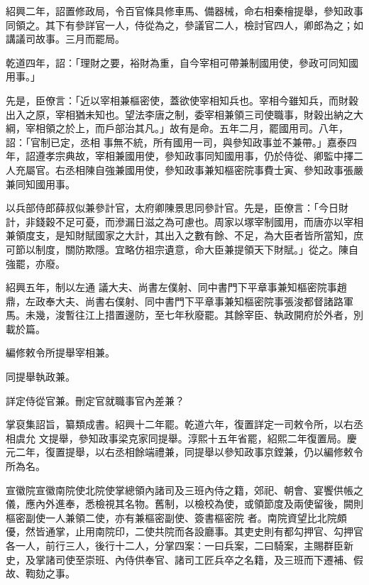 \begin{pinyinscope}
 紹興二年，詔置修政局，令百官條具修車馬、備器械，命右相秦檜提舉，參知政事同領之。其下有參詳官一人，侍從為之，參議官二人，檢討官四人，卿郎為之；如講議司故事。三月而罷局。



 乾道四年，詔：「理財之要，裕財為重，自今宰相可帶兼制國用使，參政可同知國用事。」



 先是，臣僚言：「近以宰相兼樞密使，蓋欲使宰相知兵也。宰相今雖知兵，而財穀出入之原，宰相猶未知也。望法李唐之制，委宰相兼領三司使職事，財穀出納之大綱，宰相領之於上，而戶部治其凡。」故有是命。五年二月，罷國用司。八年，詔：「官制已定，丞相
 事無不統，所有國用一司，與參知政事並不兼帶。」嘉泰四年，詔遵孝宗典故，宰相兼國用使，參知政事同知國用事，仍於侍從、卿監中擇二人充屬官。右丞相陳自強兼國用使，參知政事兼知樞密院事費士寅、參知政事張嚴兼同知國用事。



 以兵部侍郎薛叔似兼參計官，太府卿陳景思同參計官。先是，臣僚言：「今日財計，非錢穀不足可憂，而滲漏日滋之為可慮也。周家以塚宰制國用，而唐亦以宰相兼領度支，是知財賦國家之大計，其出入之數有餘、不足，為大臣者皆所當知，庶可節以制度，關防欺隱。宜略仿祖宗遺意，命大臣兼提領天下財賦。」從之。陳自強罷，亦廢。



 紹興五年，制以左通
 議大夫、尚書左僕射、同中書門下平章事兼知樞密院事趙鼎，左政奉大夫、尚書右僕射、同中書門下平章事兼知樞密院事張浚都督諸路軍馬。未幾，浚暫往江上措置邊防，至七年秋廢罷。其餘宰臣、執政開府於外者，別載於篇。



 編修敕令所提舉宰相兼。



 同提舉執政兼。



 詳定侍從官兼。刪定官就職事官內差兼？



 掌裒集詔旨，纂類成書。紹興十二年罷。乾道六年，復置詳定一司敕令所，以右丞相虞允
 文提舉，參知政事梁克家同提舉。淳熙十五年省罷，紹熙二年復置局。慶元二年，復置提舉，以右丞相餘端禮兼，同提舉以參知政事京鏜兼，仍以編修敕令所為名。



 宣徽院宣徽南院使北院使掌總領內諸司及三班內侍之籍，郊祀、朝會、宴饗供帳之儀，應內外進奉，悉檢視其名物。舊制，以檢校為使，或領節度及兩使留後，闕則樞密副使一人兼領二使，亦有兼樞密副使、簽書樞密院
 者。南院資望比北院頗優，然皆通掌，止用南院印，二使共院而各設廳事。其吏史則有都勾押官、勾押官各一人，前行三人，後行十二人，分掌四案：一曰兵案，二曰騎案，主賜群臣新史，及掌諸司使至崇班、內侍供奉官、諸司工匠兵卒之名籍，及三班而下遷補、假故、鞫劾之事。




\end{pinyinscope}
